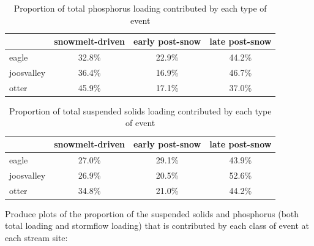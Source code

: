 \documentclass[12pt]{article}
\begin{document}
\begin{table}[h]
\begin{center}
\begin{tabular}{lccc}
  & snowmelt-driven & early post-snow & late post-snow \\ 
  \hline
eagle & 32.8\% & 22.9\% & 44.2\% \\ 
  joosvalley & 36.4\% & 16.9\% & 46.7\% \\ 
  otter & 45.9\% & 17.1\% & 37.0\% \\ 
  \end{tabular}
\caption{Proportion of total phosphorus loading contributed by each type of event}
\label{tab:ptot}
\end{center}
\end{table}
\begin{table}[h]
\begin{center}
\begin{tabular}{lccc}
  & snowmelt-driven & early post-snow & late post-snow \\ 
  \hline
eagle & 27.0\% & 29.1\% & 43.9\% \\ 
  joosvalley & 26.9\% & 20.5\% & 52.6\% \\ 
  otter & 34.8\% & 21.0\% & 44.2\% \\ 
  \end{tabular}
\caption{Proportion of total suspended solids loading contributed by each type of event}
\label{tab:stot}
\end{center}
\end{table}








Produce plots of the proportion of the suspended solids and phosphorus (both total loading and stormflow loading) that is contributed by each class of event at each stream site:\\
\end{document}
